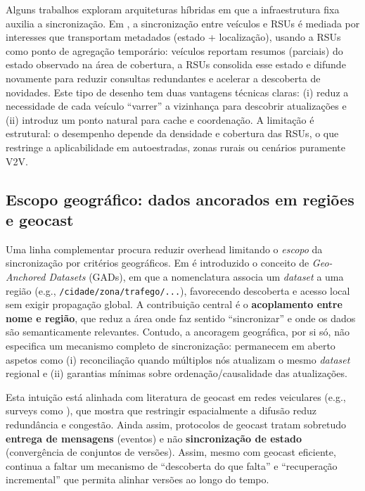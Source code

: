 Alguns trabalhos exploram arquiteturas híbridas em que a infraestrutura fixa auxilia a sincronização. Em \cite{noauthor_vehicle_2017}, a sincronização entre veículos e \gls{RSUs} é mediada por interesses que transportam metadados (estado + localização), usando a \gls{RSUs} como ponto de agregação temporário: veículos reportam resumos (parciais) do estado observado na área de cobertura, a \gls{RSUs} consolida esse estado e difunde novamente para reduzir consultas redundantes e acelerar a descoberta de novidades. Este tipo de desenho tem duas vantagens técnicas claras: (i) reduz a necessidade de cada veículo “varrer” a vizinhança para descobrir atualizações e (ii) introduz um ponto natural para cache e coordenação. A limitação é estrutural: o desempenho depende da densidade e cobertura das \gls{RSUs}, o que restringe a aplicabilidade em autoestradas, zonas rurais ou cenários puramente \gls{V2V}.

\subsection{Escopo geográfico: dados ancorados em regiões e geocast}

Uma linha complementar procura reduzir overhead limitando o \textit{escopo} da sincronização por critérios geográficos. Em \cite{pereira_vehicular-ndn_2026} é introduzido o conceito de \textit{Geo-Anchored Datasets} (GADs), em que a nomenclatura associa um \textit{dataset} a uma região (e.g., \texttt{/cidade/zona/trafego/...}), favorecendo descoberta e acesso local sem exigir propagação global. A contribuição central é o \textbf{acoplamento entre nome e região}, que reduz a área onde faz sentido “sincronizar” e onde os dados são semanticamente relevantes. Contudo, a ancoragem geográfica, por si só, não especifica um mecanismo completo de sincronização: permanecem em aberto aspetos como (i) reconciliação quando múltiplos nós atualizam o mesmo \textit{dataset} regional e (ii) garantias mínimas sobre ordenação/causalidade das atualizações.

Esta intuição está alinhada com literatura de geocast em redes veiculares (e.g., surveys como \cite{noauthor_geocast_2025}), que mostra que restringir espacialmente a difusão reduz redundância e congestão. Ainda assim, protocolos de geocast tratam sobretudo \textbf{entrega de mensagens} (eventos) e não \textbf{sincronização de estado} (convergência de conjuntos de versões). Assim, mesmo com geocast eficiente, continua a faltar um mecanismo de “descoberta do que falta” e “recuperação incremental” que permita alinhar versões ao longo do tempo.

